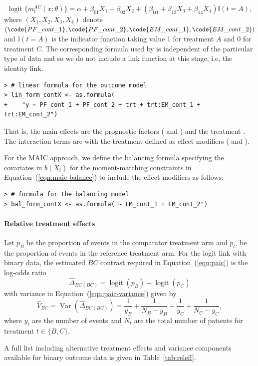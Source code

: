 \documentclass[article]{jss}
\begin{document}
$$
\operatorname{logit}\{m_t^{AC}(x; \theta)\} = \alpha + \beta_{01} X_{1} + \beta_{02}X_{2} + (\beta_{\mathrm{trt}} + \beta_{13} X_{3} + \beta_{14} X_{4}) \mathbb{I}(t = A),
$$
where $(X_1, X_2, X_3, X_4)$ denote $(\code{PF\_cont\_1}, \code{PF\_cont\_2}, \code{EM\_cont\_1}, \code{EM\_cont\_2})$ and $\mathbb{I}(t = A)$ is the indicator function taking value 1 for treatment $A$ and 0 for treatment $C$.
The corresponding  formula used by  is independent of the particular type of data and so we do not include a link function at this stage, i.e, the identity link.
\begin{verbatim}
> # linear formula for the outcome model
> lin_form_contX <- as.formula(
+    "y ~ PF_cont_1 + PF_cont_2 + trt + trt:EM_cont_1 + trt:EM_cont_2")
\end{verbatim}
That is, the main effects are the prognostic factors ( and ) and the treatment . The interaction terms are with the treatment defined as effect modifiers ( and ). 

For the MAIC approach, we define the balancing formula specifying the covariates in $b(X_i)$ for the moment-matching constraints in Equation~(\ref{eqn:maic-balance}) to include the effect modifiers as follows:
\begin{verbatim}
> # formula for the balancing model
> bal_form_contX <- as.formula("~ EM_cont_1 + EM_cont_2")
\end{verbatim}

\paragraph{Relative treatment effects}
Let $p_B$ be the proportion of events in the comparator treatment arm and $p_C$ be the proportion of events in the reference treatment arm. For the logit link with binary data, the estimated $BC$ contrast required in Equation~(\ref{eqn:paic}) is the log-odds ratio
$$
\widehat{\Delta}_{BC(BC)} = \operatorname{logit}(p_B) - \operatorname{logit}(p_C)
$$
with variance in Equation~(\ref{eqn:paic-variance}) given by
$$
\widehat{V}_{BC} = \operatorname{Var}(\widehat{\Delta}_{BC(BC)}) = \frac{1}{y_B} + \frac{1}{N_B - y_B} + \frac{1}{y_C} + \frac{1}{N_C - y_C},
$$
where $y_t$ are the number of events and $N_t$ are the total number of patients for treatment $t \in \{B, C\}$.

A full list including alternative treatment effects and variance components available for binary outcome data is given in Table~\ref{tab:releff}.
\end{document}
